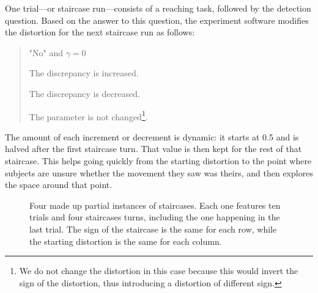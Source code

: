 One trial---or staircase run---consists of a reaching task, followed by the detection question. Based on the answer to this question, the experiment software modifies the distortion for the next staircase run as follows:
\begin{quote}
    \begin{labeling}{"No" and $\gamma = 0$}
      \item ["Yes"] The discrepancy is increased.
      \item ["No" and $\gamma \neq 0$] The discrepancy is decreased.
      \item ["No" and $\gamma = 0$] The parameter is not changed\footnote{We do not change the distortion in this case because this would invert the sign of the distortion, thus introducing a distortion of different sign.}.
    \end{labeling}
\end{quote}

The amount of each increment or decrement is dynamic: it starts at \num{0.5} and is halved after the first staircase turn. That value is then kept for the rest of that staircase. This helps going quickly from the starting distortion to the point where subjects are unsure whether the movement they saw was theirs, and then explores the space around that point.

\begin{figure}[h]
    \caption{Four made up partial instances of staircases. Each one features ten trials and four staircases turns, including the one happening in the last trial. The sign of the staircase is the same for each row, while the starting distortion is the same for each column.}\label{fig:trials}
\end{figure}


